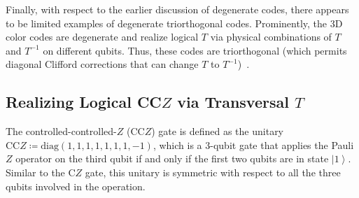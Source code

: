 \documentclass[twoside,romanappendices]{IEEEtran}
\newtheorem{theorem}{Theorem}
\newcommand{\ket}[1]{\left\lvert #1 \right\rangle}
\newcommand{\llbr}{[\![}
\newcommand{\rrbr}{]\!]}
\begin{document}
Finally, with respect to the earlier discussion of degenerate codes, there appears to be limited examples of degenerate triorthogonal codes. 
Prominently, the 3D color codes are degenerate and realize logical $T$ via physical combinations of $T$ and $T^{-1}$ on different qubits.
Thus, these codes are triorthogonal (which permits diagonal Clifford corrections that can change $T$ to $T^{-1}$)~\cite{Watson-pra15}.








\subsection{Realizing Logical CC$Z$ via Transversal $T$}
\label{sec:logical_ccz}

The controlled-controlled-$Z$ (CC$Z$) gate is defined as the unitary $\text{CC}Z \coloneqq \text{diag}(1,1,1,1,1,1,1,-1)$, which is a $3$-qubit gate that applies the Pauli $Z$ operator on the third qubit if and only if the first two qubits are in state $\ket{1}$.
Similar to the C$Z$ gate, this unitary is symmetric with respect to all the three qubits involved in the operation.
\end{document}
